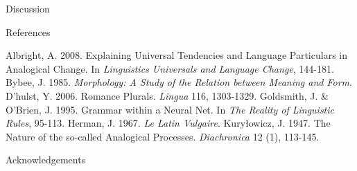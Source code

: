 \documentclass[final]{beamer}
\newlength{\onecolwid}
\begin{document}
\begin{frame}[t]
\begin{columns}[t]
\begin{column}{\onecolwid}
\begin{alertblock}{Discussion}
\end{alertblock}


\begin{block}{References}

\tiny
Albright, A. 2008. Explaining Universal Tendencies and Language Particulars in Analogical Change. In \textit{Linguistics Universals and Language Change}, 144-181. Bybee, J. 1985. \textit{Morphology: A Study of the Relation between Meaning and Form}. D'hulst, Y. 2006. Romance Plurals. \textit{Lingua} 116, 1303-1329. \break Goldsmith, J. \& O'Brien, J. 1995. Grammar within a Neural Net. In \textit{The Reality of Linguistic Rules}, 95-113. \break Herman, J. 1967. \textit{Le Latin Vulgaire}. \break Kury\l owicz, J. 1947. The Nature of the so-called Analogical Processes. \textit{Diachronica} 12 (1), 113-145. 


\end{block}



\begin{block}{Acknowledgements}

\footnotesize{} \\

\end{block}




\end{column}
\end{columns}
\end{frame}
\end{document}
